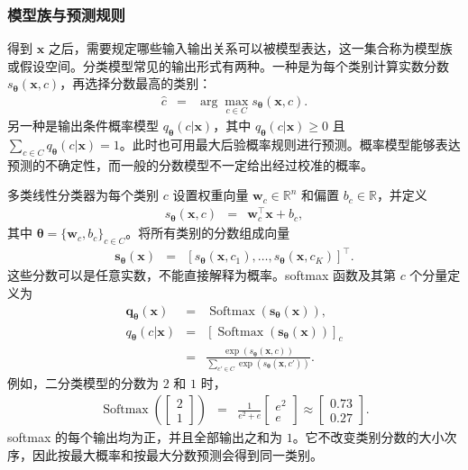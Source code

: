 \subsubsection{模型族与预测规则}

得到 $\mathbf{x}$ 之后，需要规定哪些输入输出关系可以被模型表达，这一集合称为模型族或假设空间。分类模型常见的输出形式有两种。一种是为每个类别计算实数分数 $s_{\boldsymbol{\theta}}(\mathbf{x},c)$，再选择分数最高的类别：
\begin{eqnarray}
\hat{c}
& = &
\arg\max_{c\in C}s_{\boldsymbol{\theta}}(\mathbf{x},c).
\label{eq:sec12-classification-prediction}
\end{eqnarray}
另一种是输出条件概率模型 $q_{\boldsymbol{\theta}}(c|\mathbf{x})$，其中 $q_{\boldsymbol{\theta}}(c|\mathbf{x})\geq 0$ 且 $\sum_{c\in C}q_{\boldsymbol{\theta}}(c|\mathbf{x})=1$。此时也可用最大后验概率规则进行预测。概率模型能够表达预测的不确定性，而一般的分数模型不一定给出经过校准的概率。

多类线性分类器为每个类别 $c$ 设置权重向量 $\mathbf{w}_c\in\mathbb{R}^{n}$ 和偏置 $b_c\in\mathbb{R}$，并定义
\begin{eqnarray}
s_{\boldsymbol{\theta}}(\mathbf{x},c)
& = &
\mathbf{w}_c^{\top}\mathbf{x}+b_c,
\label{eq:sec12-linear-score}
\end{eqnarray}
其中 $\boldsymbol{\theta}=\{\mathbf{w}_c,b_c\}_{c\in C}$。将所有类别的分数组成向量
\begin{eqnarray}
\mathbf{s}_{\boldsymbol{\theta}}(\mathbf{x})
& = &
\left[
s_{\boldsymbol{\theta}}(\mathbf{x},c_1),
\ldots,
s_{\boldsymbol{\theta}}(\mathbf{x},c_K)
\right]^{\top}.
\end{eqnarray}
这些分数可以是任意实数，不能直接解释为概率。softmax 函数及其第 $c$ 个分量定义为
\begin{eqnarray}
\mathbf{q}_{\boldsymbol{\theta}}(\mathbf{x})
& = &
\operatorname{Softmax}\!\left(
\mathbf{s}_{\boldsymbol{\theta}}(\mathbf{x})
\right),\\
q_{\boldsymbol{\theta}}(c|\mathbf{x})
& = &
\left[
\operatorname{Softmax}\!\left(
\mathbf{s}_{\boldsymbol{\theta}}(\mathbf{x})
\right)
\right]_{c} \nonumber\\
& = &
\frac{\exp\!\left(s_{\boldsymbol{\theta}}(\mathbf{x},c)\right)}
{\sum_{c'\in C}\exp\!\left(s_{\boldsymbol{\theta}}(\mathbf{x},c')\right)}.
\end{eqnarray}
例如，二分类模型的分数为 $2$ 和 $1$ 时，
\begin{eqnarray}
\operatorname{Softmax}\!\left(
\begin{bmatrix}2\\1\end{bmatrix}
\right)
& = &
\frac{1}{e^2+e}
\begin{bmatrix}e^2\\e\end{bmatrix}
\approx
\begin{bmatrix}0.73\\0.27\end{bmatrix}.
\end{eqnarray}
softmax 的每个输出均为正，并且全部输出之和为 $1$。它不改变类别分数的大小次序，因此按最大概率和按最大分数预测会得到同一类别。

